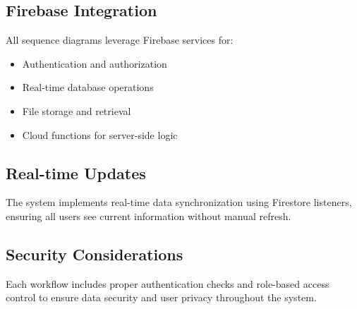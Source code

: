 \documentclass[12pt,a4paper]{article}
\begin{document}
\subsection{Firebase Integration}
All sequence diagrams leverage Firebase services for:
\begin{itemize}[leftmargin=*]
    \item Authentication and authorization
    \item Real-time database operations
    \item File storage and retrieval
    \item Cloud functions for server-side logic
\end{itemize}

\subsection{Real-time Updates}
The system implements real-time data synchronization using Firestore listeners, ensuring all users see current information without manual refresh.

\subsection{Security Considerations}
Each workflow includes proper authentication checks and role-based access control to ensure data security and user privacy throughout the system.
\end{document}
